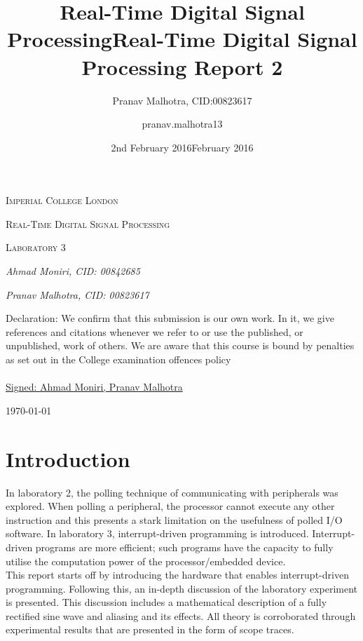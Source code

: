 \documentclass{article}
\title{Real-Time Digital Signal Processing}
\author{
  Pranav Malhotra, CID:\num{00823617}
}
\date{2nd February 2016}
\title{Real-Time Digital Signal Processing Report 2}
\author{pranav.malhotra13 }
\date{February 2016}
\begin{document}
\begin{titlepage}
	\centering
	{\scshape\LARGE Imperial College London \par}
	\vspace{2cm}
	{\scshape\Large Real-Time Digital Signal Processing \par}
	\vspace{1cm}
	{\scshape\Large Laboratory 3\par}
	\vspace{2.5cm}
	{\Large\itshape Ahmad Moniri, CID: 00842685 \par}
	\vspace{1cm}
	{\Large\itshape Pranav Malhotra, CID: 00823617 \par}
	\vfill
	\begin{tcolorbox}
    \centering
    Declaration: We confirm that this submission is our own work. In it, we give references and citations whenever we refer to or use the published, or
    unpublished, work of others. We are aware that this course is bound by
    penalties as set out in the College examination offences policy \\~\\
    \underline{Signed: Ahmad Moniri, Pranav Malhotra}
    \end{tcolorbox}
	{\large \today\par}
\end{titlepage}

\tableofcontents

\newpage
\section{Introduction}
In laboratory 2, the polling technique of communicating with peripherals was explored. When polling a peripheral, the processor cannot execute any other instruction and this presents a stark limitation on the usefulness of polled I/O software. In laboratory 3, interrupt-driven programming is introduced. Interrupt-driven programs are more efficient; such programs have the capacity to fully utilise the computation power of the processor/embedded device.\\

This report starts off by introducing the hardware that enables interrupt-driven programming. Following this, an in-depth discussion of the laboratory experiment is presented. This discussion includes a mathematical description of a fully rectified sine wave and aliasing and its effects. All theory is corroborated through experimental results that are presented in the form of scope traces.   
\end{document}
